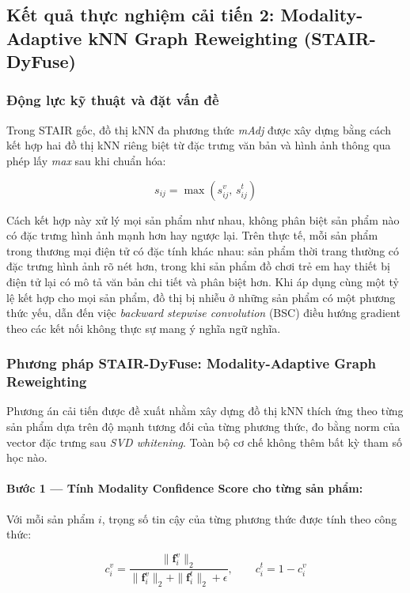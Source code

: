 \begin{longtable}
\subsection{Kết quả thực nghiệm cải tiến 2: Modality-Adaptive kNN Graph Reweighting (STAIR-DyFuse)}
 
\subsubsection{Động lực kỹ thuật và đặt vấn đề}
 
Trong STAIR gốc, đồ thị kNN đa phương thức \textit{mAdj} được xây dựng bằng cách kết hợp hai đồ thị kNN riêng biệt từ đặc trưng văn bản và hình ảnh thông qua phép lấy \textit{max} sau khi chuẩn hóa:
 
\begin{equation}
s_{ij} = \max(s_{ij}^v,\, s_{ij}^t)
\end{equation}
 
Cách kết hợp này xử lý mọi sản phẩm như nhau, không phân biệt sản phẩm nào có đặc trưng hình ảnh mạnh hơn hay ngược lại. Trên thực tế, mỗi sản phẩm trong thương mại điện tử có đặc tính khác nhau: sản phẩm thời trang thường có đặc trưng hình ảnh rõ nét hơn, trong khi sản phẩm đồ chơi trẻ em hay thiết bị điện tử lại có mô tả văn bản chi tiết và phân biệt hơn. Khi áp dụng cùng một tỷ lệ kết hợp cho mọi sản phẩm, đồ thị bị nhiễu ở những sản phẩm có một phương thức yếu, dẫn đến việc \textit{backward stepwise convolution} (BSC) điều hướng gradient theo các kết nối không thực sự mang ý nghĩa ngữ nghĩa.
 
\subsubsection{Phương pháp STAIR-DyFuse: Modality-Adaptive Graph Reweighting}
 
Phương án cải tiến được đề xuất nhằm xây dựng đồ thị kNN thích ứng theo từng sản phẩm dựa trên độ mạnh tương đối của từng phương thức, đo bằng norm của vector đặc trưng sau \textit{SVD whitening}. Toàn bộ cơ chế không thêm bất kỳ tham số học nào.
 
\paragraph{Bước 1 — Tính Modality Confidence Score cho từng sản phẩm:}
 
Với mỗi sản phẩm $i$, trọng số tin cậy của từng phương thức được tính theo công thức:
 
\begin{equation}
c_i^v = \frac{\|\mathbf{f}_i^v\|_2}{\|\mathbf{f}_i^v\|_2 + \|\mathbf{f}_i^t\|_2 + \epsilon}, \qquad c_i^t = 1 - c_i^v
\end{equation}
 

\end{longtable}
